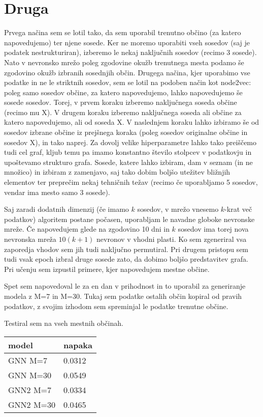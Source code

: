 \documentclass{article}
\begin{document}
\section{Druga} 
Prvega načina sem se lotil tako, da sem uporabil trenutno občino (za katero napovedujemo) ter njene sosede. Ker ne moremo uporabiti vseh sosedov (saj je podatek nestrukturiran), izberemo le nekaj naključnih sosedov (recimo 3 sosede). Nato v nevronsko mrežo poleg zgodovine okužb trenutnega mesta podamo še zgodovino okužb izbranih sosednjih občin. Drugega načina, kjer uporabimo vse podatke in ne le striktnih sosedov, sem se lotil na podoben način kot node2vec: poleg samo sosedov občine, za katero napovedujemo, lahko napovedujemo še sosede sosedov. Torej, v prvem koraku izberemo naključnega soseda občine (recimo mu X). V drugem koraku izberemo naključnega soseda ali občine za katero napovedujemo, ali od soseda X. V naslednjem koraku lahko izbiramo še od sosedov izbrane občine iz prejšnega koraka (poleg sosedov originalne občine in sosedov X), in tako naprej. Za dovolj velike hiperparametre lahko tako preiščemo tudi cel graf, kljub temu pa imamo konstantno število stolpcev v podatkovju in upoštevamo strukturo grafa. Sosede, katere lahko izbiram, dam v seznam (in ne množico) in izbiram z zamenjavo, saj tako dobim boljšo utežitev bližnjih elementov ter preprečim nekaj tehničnih težav (recimo če uporabljamo 5 sosedov, vendar ima mesto samo 3 sosede).

Saj zaradi dodatnih dimenzij (če imamo \(k\) sosedov, v mrežo vnesemo \(k\)-krat več podatkov) algoritem postane počasen, uporabljam le navadne globoke nevronske mreže. Če napovedujem glede na zgodovino 10 dni in \(k\) sosedov ima torej nova nevronska mreža \(10(k+1)\) nevronov v vhodni plasti. Ko sem zgeneriral vsa zaporedja vhodov sem jih tudi naključno permutiral. Pri drugem pristopu sem tudi vsak epoch izbral druge sosede zato, da dobimo boljšo predstavitev grafa. Pri učenju sem izpustil primere, kjer napovedujem mestne občine.

Spet sem napovedoval le za en dan v prihodnost in to uporabil za generiranje modela z M=7 in M=30. Tukaj sem podatke ostalih občin kopiral od pravih podatkov, z svojim izhodom sem spreminjal le podatke trenutne občine.

Testiral sem na vseh mestnih občinah.


\begin{table}[]
    \begin{tabular}{@{}ll@{}}
    \toprule
    model     & napaka \\ \midrule
    GNN M=7   & 0.0312 \\
    GNN M=30  & 0.0549 \\
    GNN2 M=7  & 0.0334 \\
    GNN2 M=30 & 0.0465
    \end{tabular}
    \end{table}
\end{document}
